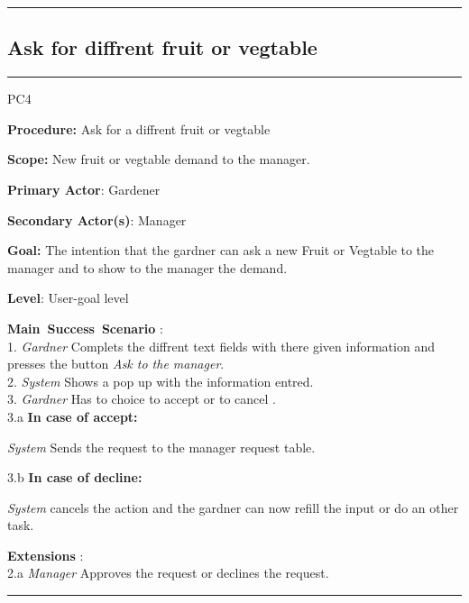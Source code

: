 \hrule
\vspace{0.5cm}

\break

\subsection{Ask for diffrent fruit or vegtable}

\vspace{0.5cm}
\hrule
\hfill \break
\begin{lyxlist}{PC4}
\small{
\item [\textbf{Procedure:}] Ask for a diffrent fruit or vegtable
\item [\textbf{Scope:}] New fruit or vegtable demand to the manager.
\item [\textbf{Primary Actor}:] Gardener
\item [\textbf{Secondary Actor(s)}:] Manager
\item [\textbf{Goal:}] The intention that the gardner can ask a new Fruit or
Vegtable to the manager and to show to the manager the demand.
\item [\textbf{Level}:] User-goal level
\item [\textbf{Main~Success~Scenario}]:\\
1. \emph{Gardner} Complets the diffrent text fields with there given
information and presses the button \emph{Ask to the manager}. \\
2. \emph{System} Shows a pop up with the information entred.\\
3. \emph{Gardner} Has to choice to accept or to cancel .\\
	3.a \textbf{In case of accept:}
		\begin{Tab}{2em} \emph{System} Sends the request to the manager
		request table.\end{Tab}
	3.b \textbf{In case of decline:}
		\begin{Tab}{2em} \emph{System} cancels the action and the gardner can
		now refill the input or do an other task. \end{Tab}
\item [\textbf{Extensions}]:\\
2.a  \emph{Manager} Approves the request or declines the request.\\
}
\end{lyxlist}
\hrule
\vspace{0.5cm}







